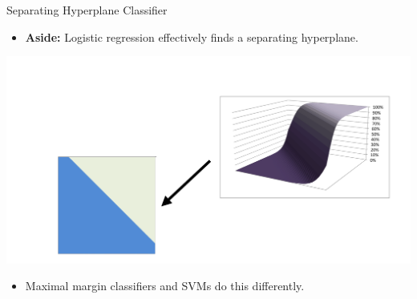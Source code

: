 \begin{frame}{Separating Hyperplane Classifier}
\begin{itemize}
  \item \textbf{Aside:} Logistic regression effectively finds a separating hyperplane.
\end{itemize}

\centering
\includegraphics[width=0.75\linewidth]{images/support-vector-machines/support-vector-machines-5.png}

\vspace{1em}

\begin{itemize}
  \item Maximal margin classifiers and SVMs do this differently.
\end{itemize}
\end{frame}


